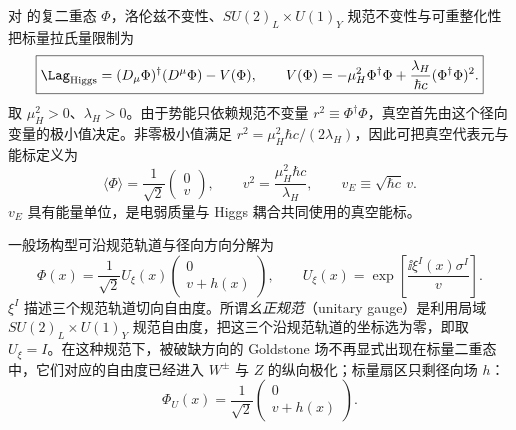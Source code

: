\begin{definition}
对  的复二重态 $\Phi$，洛伦兹不变性、$SU(2)_L\times U(1)_Y$ 规范不变性与可重整化性把标量拉氏量限制为
\begin{equation}
 \boxed{
 \Lag_{\rm Higgs}
 =(D_\mu\Phi)^\dagger(D^\mu\Phi)
 -V(\Phi),
 \qquad
 V(\Phi)=-\mu_H^2\Phi^\dagger\Phi
 +\frac{\lambda_H}{\hbar c}(\Phi^\dagger\Phi)^2.}
 \label{eq:sm-higgs-lagrangian-dp11}
\end{equation}
取 $\mu_H^2>0$、$\lambda_H>0$。由于势能只依赖规范不变量 $r^2\equiv\Phi^\dagger\Phi$，真空首先由这个径向变量的极小值决定。非零极小值满足 $r^2=\mu_H^2\hbar c/(2\lambda_H)$，因此可把真空代表元与能标定义为
\begin{equation}
 \boxed{
 \langle\Phi\rangle
 =\frac1{\sqrt2}\begin{pmatrix}0\\v\end{pmatrix},
 \qquad
 v^2=\frac{\mu_H^2\hbar c}{\lambda_H},
 \qquad
 v_E\equiv\sqrt{\hbar c}\,v.}
 \label{eq:sm-higgs-vev-dp11}
\end{equation}
$v_E$ 具有能量单位，是电弱质量与 Higgs 耦合共同使用的真空能标。
\end{definition}

\begin{definition}[真空轨道坐标与幺正规范]
一般场构型可沿规范轨道与径向方向分解为
\begin{equation*}
 \Phi(x)
 =\frac1{\sqrt2}
 U_\xi(x)
 \begin{pmatrix}0\\v+h(x)\end{pmatrix},
 \qquad
 U_\xi(x)=\exp\!\left[
 \frac{\ii\xi^I(x)\sigma^I}{v}
 \right].
\end{equation*}
$\xi^I$ 描述三个规范轨道切向自由度。所谓\emph{幺正规范}（unitary gauge）是利用局域 $SU(2)_L\times U(1)_Y$ 规范自由度，把这三个沿规范轨道的坐标选为零，即取 $U_\xi=I$。在这种规范下，被破缺方向的 Goldstone 场不再显式出现在标量二重态中，它们对应的自由度已经进入 $W^\pm$ 与 $Z$ 的纵向极化；标量扇区只剩径向场 $h$：
\begin{equation}
 \Phi_U(x)=\frac1{\sqrt2}\begin{pmatrix}0\\v+h(x)\end{pmatrix}.
 \label{eq:sm-higgs-unitary-gauge-dp11}
\end{equation}
\end{definition}

